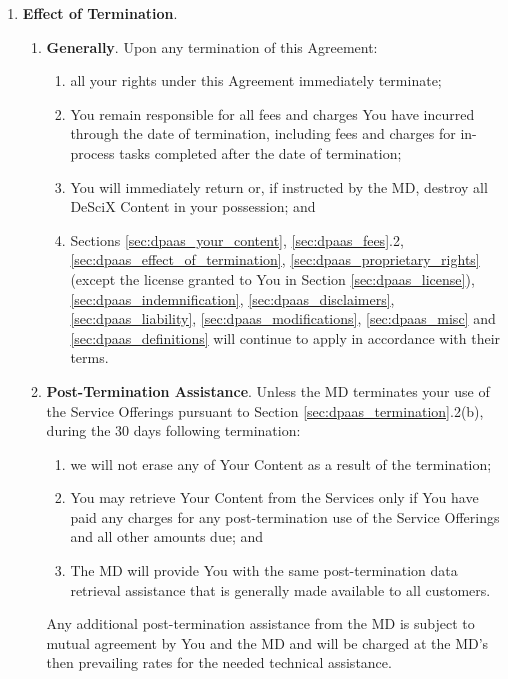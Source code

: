 \documentclass{article}
\begin{document}
\begin{enumerate}
    \item \textbf{Effect of Termination}.
    
    \begin{enumerate}
        \item \textbf{Generally}. Upon any termination of this Agreement:
        \begin{enumerate}
            \item all your rights under this Agreement immediately terminate;
            \item You remain responsible for all fees and charges You have incurred through the date of termination, including fees and charges for in-process tasks completed after the date of termination;
            \item You will immediately return or, if instructed by the MD, destroy all DeSciX Content in your possession; and
            \item Sections \ref{sec:dpaas_your_content}, \ref{sec:dpaas_fees}.2, \ref{sec:dpaas_effect_of_termination}, \ref{sec:dpaas_proprietary_rights} (except the license granted to You in Section \ref{sec:dpaas_license}), \ref{sec:dpaas_indemnification}, \ref{sec:dpaas_disclaimers}, \ref{sec:dpaas_liability}, \ref{sec:dpaas_modifications}, \ref{sec:dpaas_misc} and \ref{sec:dpaas_definitions} will continue to apply in accordance with their terms.
        \end{enumerate}
        \item \textbf{Post-Termination Assistance}. Unless the MD terminates your use of the Service Offerings pursuant to Section \ref{sec:dpaas_termination}.2(b), during the 30 days following termination:
        \begin{enumerate}
            \item we will not erase any of Your Content as a result of the termination;
            \item You may retrieve Your Content from the Services only if You have paid any charges for any post-termination use of the Service Offerings and all other amounts due; and
            \item The MD will provide You with the same post-termination data retrieval assistance that is generally made available to all customers.
        \end{enumerate}
        Any additional post-termination assistance from the MD is subject to mutual agreement by You and the MD and will be charged at the MD's then prevailing rates for the needed technical assistance.
    \end{enumerate}


\end{enumerate}
\end{document}
